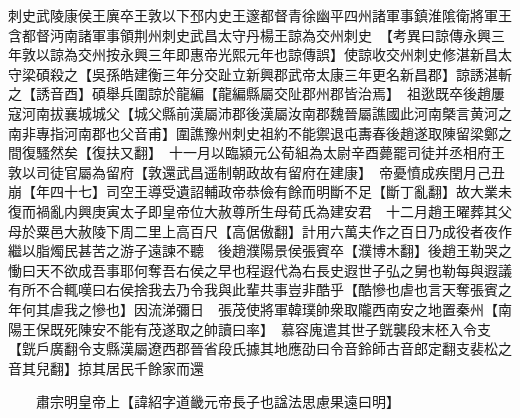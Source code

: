 刺史武陵康侯王廙卒王敦以下邳内史王邃都督青徐幽平四州諸軍事鎮淮隂衛將軍王含都督沔南諸軍事領荆州刺史武昌太守丹楊王諒為交州刺史　【考異曰諒傳永興三年敦以諒為交州按永興三年即惠帝光熙元年也諒傳誤】使諒收交州刺史修湛新昌太守梁碩殺之【吳孫皓建衡三年分交趾立新興郡武帝太康三年更名新昌郡】諒誘湛斬之【誘音酉】碩舉兵圍諒於龍編【龍編縣屬交阯郡州郡皆治焉】　祖逖既卒後趙屢寇河南拔襄城城父【城父縣前漢屬沛郡後漢屬汝南郡魏晉屬譙國此河南槩言黄河之南非專指河南郡也父音甫】圍譙豫州刺史祖約不能禦退屯夀春後趙遂取陳留梁鄭之間復騷然矣【復扶又翻】　十一月以臨潁元公荀組為太尉辛酉薨罷司徒并丞相府王敦以司徒官屬為留府【敦還武昌遥制朝政故有留府在建康】　帝憂憤成疾閏月己丑崩【年四十七】司空王導受遺詔輔政帝恭儉有餘而明斷不足【斷丁亂翻】故大業未復而禍亂内興庚寅太子即皇帝位大赦尊所生母荀氏為建安君　十二月趙王曜葬其父母於粟邑大赦陵下周二里上高百尺【高倨傲翻】計用六萬夫作之百日乃成役者夜作繼以脂燭民甚苦之游子遠諫不聽　後趙濮陽景侯張賓卒【濮博木翻】後趙王勒哭之慟曰天不欲成吾事耶何奪吾右侯之早也程遐代為右長史遐世子弘之舅也勒每與遐議有所不合輒嘆曰右侯捨我去乃令我與此輩共事豈非酷乎【酷慘也虐也言天奪張賓之年何其虐我之慘也】因流涕彌日　張茂使將軍韓璞帥衆取隴西南安之地置秦州【南陽王保既死陳安不能有茂遂取之帥讀曰率】　慕容廆遣其世子皝襲段末柸入令支【皝戶廣翻令支縣漢屬遼西郡晉省段氏據其地應劭曰令音鈴師古音郎定翻支裴松之音其兒翻】掠其居民千餘家而還

　　肅宗明皇帝上【諱紹字道畿元帝長子也諡法思慮果遠曰明】

